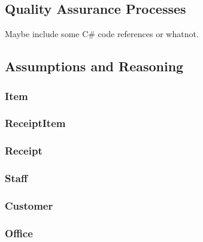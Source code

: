\documentclass{article}
\begin{document}
        \newpage




        \subsection{Quality Assurance Processes}
        \label{sec:QAP}
            Maybe include some C\# code references or whatnot.

        \newpage
        \subsection{Assumptions and Reasoning}
        \label{sec:AR}
            \subsubsection{Item}

            \subsubsection{ReceiptItem}

            \subsubsection{Receipt}

            \subsubsection{Staff}

            \subsubsection{Customer}

            \subsubsection{Office}

\end{document}
